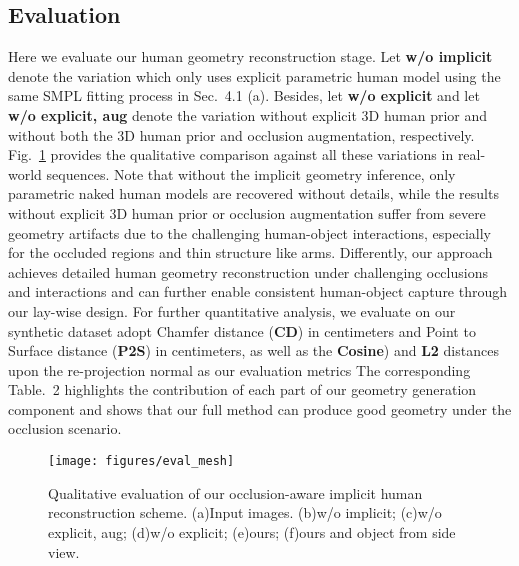 \subsection{Evaluation}

Here we evaluate our human geometry reconstruction stage. 
%
Let \textbf{w/o implicit} denote the variation which only uses explicit parametric human model using the same SMPL fitting process in Sec.~4.1 (a).
Besides, let \textbf{w/o explicit} and let \textbf{w/o explicit, aug} denote the variation without explicit 3D human prior and without both the 3D human prior and occlusion augmentation, respectively.
%
Fig.~\ref{fig:eval_mesh} provides the qualitative comparison against all these variations in real-world sequences. 
%
Note that without the implicit geometry inference, only parametric naked human models are recovered without details, while the results without explicit 3D human prior or occlusion augmentation suffer from severe geometry artifacts due to the challenging human-object interactions, especially for the occluded regions and thin structure like arms.
%
Differently, our approach achieves detailed human geometry reconstruction under challenging occlusions and interactions and can further enable consistent human-object capture through our lay-wise design.
%
For further quantitative analysis, we evaluate on our synthetic dataset adopt Chamfer distance (\textbf{CD}) in centimeters and Point to Surface distance (\textbf{P2S}) in centimeters, as well as the \textbf{Cosine}) and \textbf{L2} distances upon the re-projection normal as our evaluation metrics 
%
The corresponding Table.~2 highlights the contribution of each part of our geometry generation component and shows that our full method can produce good geometry under the occlusion scenario. 

\begin{figure}[t]
	\centering
	\texttt{[image: figures/eval\_mesh]}
	\caption{Qualitative evaluation of our occlusion-aware implicit human reconstruction scheme. (a)Input images. (b)w/o implicit; (c)w/o explicit, aug; (d)w/o explicit; (e)ours; (f)ours and object from side view.}
    \vspace{-10pt}
	\label{fig:eval_mesh}
\end{figure}

